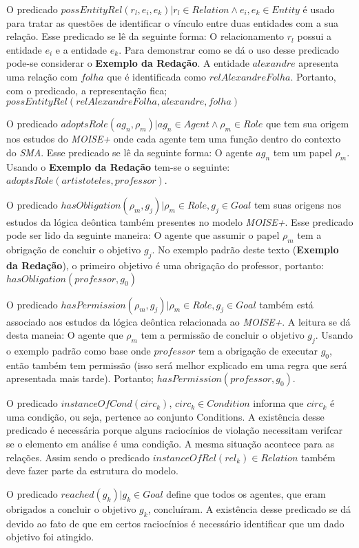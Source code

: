 O predicado $possEntityRel(r_l,e_i,e_k) | r_l \in Relation \wedge  e_i, e_k \in Entity$ é usado para tratar as questões de identificar o vínculo entre duas entidades com a sua relação. Esse predicado se lê da seguinte forma: O relacionamento $r_l$ possui a entidade $e_i$ e a entidade $e_k$. Para demonstrar como se dá o uso desse predicado pode-se considerar o \textbf{Exemplo da Redação}. A entidade $alexandre$ apresenta uma relação com $folha$ que é identificada como $relAlexandreFolha$. Portanto, com o predicado, a representação fica; $possEntityRel(relAlexandreFolha,alexandre,folha)$

O predicado $adoptsRole(ag_n,\rho_m) | ag_n \in Agent \wedge \rho_m \in Role$ que tem sua origem nos estudos do \textit{MOISE+} onde cada agente tem uma função dentro do contexto do \textit{SMA}. Esse predicado se lê da seguinte forma: O agente $ag_n$ tem um papel $\rho_m$. Usando o \textbf{Exemplo da Redação} tem-se o seguinte: $adoptsRole(artistoteles,professor)$. 

O predicado $hasObligation(\rho_m,g_j) | \rho_m \in Role, g_j \in Goal $ tem suas origens nos estudos da lógica deôntica também presentes no modelo \textit{MOISE+}. Esse predicado pode ser lido da seguinte maneira: O agente que assumir o papel $\rho_m$ tem a obrigação de concluir o objetivo $g_j$. No exemplo padrão deste texto (\textbf{Exemplo da Redação}), o primeiro objetivo é uma obrigação do professor, portanto: $hasObligation(professor,g_0)$

O predicado $hasPermission(\rho_m, g_j) | \rho_m \in Role, g_j \in Goal $ também está associado aos estudos da lógica deôntica relacionada ao \textit{MOISE+}. A leitura se dá desta maneia: O agente que $\rho_m$ tem a permissão de concluir o objetivo $g_j$. Usando o exemplo padrão como base onde $professor$ tem a obrigação de executar $g_0$, então também tem permissão (isso será melhor explicado em uma regra que será apresentada mais tarde). Portanto; $hasPermission(professor,g_0)$.  

O predicado $instanceOfCond(circ_k)$, $circ_k \in Condition$ informa que $circ_k$ é uma condição, ou seja, pertence ao conjunto Conditions. A existência desse predicado é necessária porque alguns raciocínios de violação necessitam verifcar se o elemento em análise é uma condição. A mesma situação acontece para as relações. Assim sendo o predicado $ instanceOfRel(rel_k) \in Relation $ também deve fazer parte da estrutura do modelo.

O predicado $reached(g_k) | g_k \in Goal $ define que todos os agentes, que eram obrigados a concluir o objetivo $g_k$, concluíram. A existência desse predicado se dá devido ao fato de que em certos raciocínios é necessário identificar que um dado objetivo foi atingido. 

